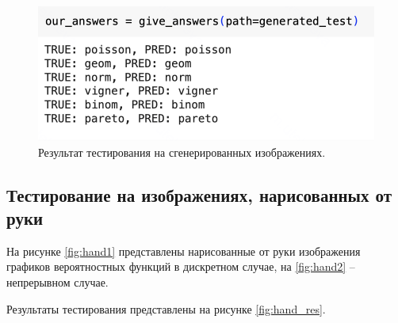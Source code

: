 \documentclass[14pt, russian]{scrartcl}
\begin{document}
\begin{figure}[H]
	\centering
	\begin{minipage}[t]{.5\textwidth}
		\centering
		\includegraphics[width=\linewidth]{./img/gen_res.png}
	\end{minipage}
	\caption{Результат тестирования на сгенерированных изображениях.}
	\label{fig:gen_res}
\end{figure}

\subsection{Тестирование на изображениях, нарисованных от руки}
На рисунке \ref{fig:hand1} представлены нарисованные от руки изображения графиков вероятностных функций в дискретном случае, на \ref{fig:hand2} -- непрерывном случае.

Результаты тестирования представлены на рисунке \ref{fig:hand_res}.
\end{document}
